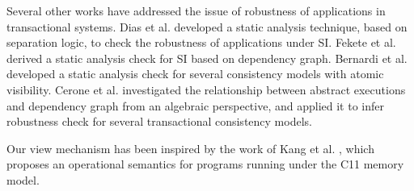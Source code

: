 Several other works have addressed the issue of robustness of applications in transactional systems. 
Dias et al. \cite{dias-tm} developed a static analysis technique, based on separation logic, 
to check the robustness of applications under SI. Fekete et al. \cite{fekete-tods} derived 
a static analysis check for SI based on dependency graph. Bernardi et al. \cite{giovanni-concur16} 
developed a static analysis check for several consistency models with atomic visibility. 
Cerone et al. \cite{laws} investigated the relationship between abstract 
executions and dependency graph from an algebraic perspective, and applied it to infer 
robustness check for several transactional consistency models.

Our view mechanism has been inspired by the work of Kang et al. \cite{promises}, 
which proposes an operational semantics for programs running under the C11 memory model.